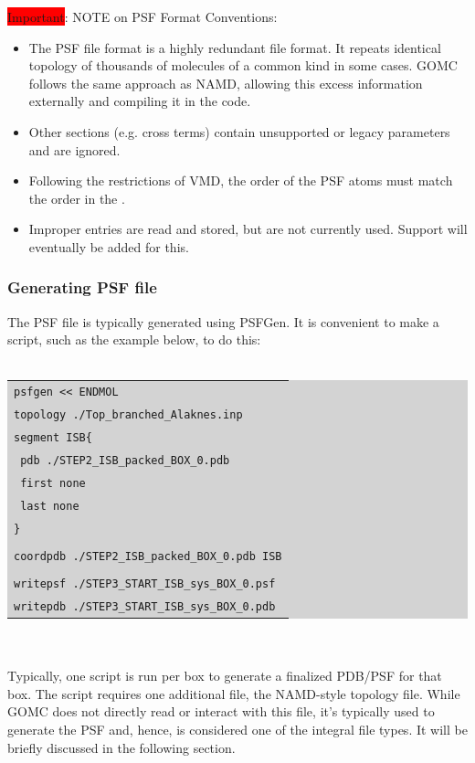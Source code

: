 \colorbox{red}{Important}: NOTE on PSF Format Conventions:
\begin{itemize}
\item The PSF file format is a highly redundant file format.  It repeats identical topology of thousands of molecules of a common kind in some cases. GOMC follows the same approach as NAMD, allowing this excess information externally and compiling it in the code.
\item Other sections (e.g. cross terms) contain unsupported or legacy parameters and are ignored.
\item Following the restrictions of VMD, the order of the PSF atoms must match the order in the 
.
\item Improper entries are read and stored, but are not currently used.  Support will eventually be added for this.
\end{itemize}

\subsubsection{Generating PSF file}
The PSF file is typically generated using PSFGen. It is convenient to make a script, such as the example below, to do this:\\\\
\colorbox{lightgray}{
\begin{tabular}{l}
\texttt{psfgen << ENDMOL}\\
\texttt{topology ./Top\_branched\_Alaknes.inp}\\
\texttt{segment ISB\{}\\
\texttt{    pdb ./STEP2\_ISB\_packed\_BOX\_0.pdb}\\
\texttt{    first none}\\
\texttt{    last none}\\
\texttt{\}}\\\\
\texttt{coordpdb ./STEP2\_ISB\_packed\_BOX\_0.pdb ISB}\\\\
\texttt{writepsf ./STEP3\_START\_ISB\_sys\_BOX\_0.psf}\\
\texttt{writepdb ./STEP3\_START\_ISB\_sys\_BOX\_0.pdb}\\
\end{tabular}
}\\\\
Typically, one script is run per box to generate a finalized PDB/PSF for that box. The script requires one additional file, the NAMD-style topology file. While GOMC does not directly read or interact with this file, it's typically used to generate the PSF and, hence, is considered one of the integral file types. It will be briefly discussed in the following section.\\\\


